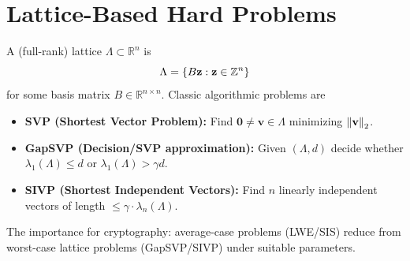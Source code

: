 \chapter{Lattice-Based Hard Problems}

A (full-rank) lattice $\Lambda \subset \mathbb{R}^n$ is \[
\Lambda = \{B\textbf{z} : \textbf{z}\in\mathbb{Z}^n\}\]
for some basis matrix $B\in\mathbb{R}^{n\times n}$. Classic algorithmic problems are
\begin{itemize}[leftmargin=*]
	\item \textbf{SVP (Shortest Vector Problem):} Find $\textbf{0}\neq \textbf{v}\in\Lambda$ minimizing $\left\lVert \textbf{v} \right\rVert_2$.
	\item \textbf{GapSVP (Decision/SVP approximation):} Given $(\Lambda, d)$ decide whether $\lambda_1(\Lambda)\le d$ or $\lambda_1(\Lambda)> \gamma d$.
	\item \textbf{SIVP (Shortest Independent Vectors):} Find $n$ linearly independent vectors of length $\le \gamma\cdot \lambda_n(\Lambda)$.
\end{itemize}
The importance for cryptography: average-case problems (LWE/SIS) reduce from worst-case lattice problems (GapSVP/SIVP) under suitable parameters.

